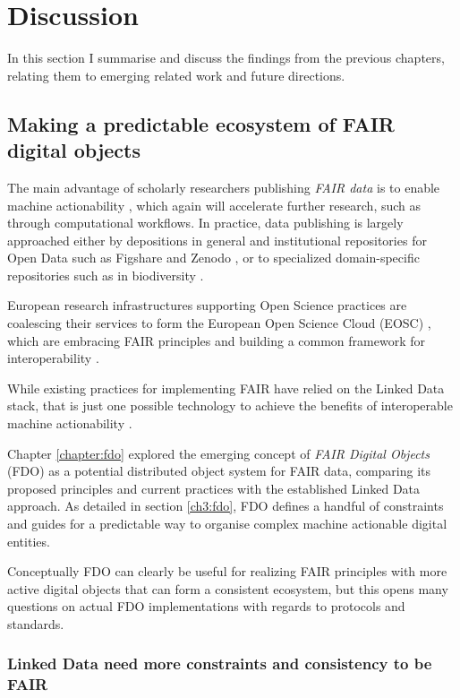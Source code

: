 \section{Discussion}
\label{ch61:discuss}

In this section I summarise and discuss the findings from the previous chapters, relating them to emerging related work and future directions.

\subsection{Making a predictable ecosystem of FAIR digital objects}
\label{ch61:ecosystem}

The main advantage of scholarly researchers publishing \emph{FAIR data} is to enable machine actionability \cite{Wilkinson 2016}, which again will accelerate further research, such as through computational workflows. 
In practice, data publishing is largely approached either by depositions in general and institutional repositories for Open Data such as Figshare and Zenodo \cite{Dillen 2019}, or to specialized domain-specific repositories such as in biodiversity \cite{ch8-7}. 

European research infrastructures supporting Open Science practices are coalescing their services to form the European Open Science Cloud (EOSC) \cite{10.2777/940154}, which are embracing FAIR principles \cite{Mons 2017} and building a common framework for interoperability \cite{eosc-interop-framework}. 

While existing practices for implementing FAIR have relied on the Linked Data stack, that is just one possible technology to achieve the benefits of interoperable machine actionability \cite{Mons 2017}. 

Chapter \ref{chapter:fdo} explored the emerging concept of \emph{FAIR Digital Objects} (FDO) \cite{Schultes 2019} as a potential distributed object system for FAIR data, comparing its proposed principles and current practices with the established Linked Data approach. 
As detailed in section \vref{ch3:fdo}, FDO defines a handful of constraints and guides for a predictable way to organise complex machine actionable digital entities. 

Conceptually FDO can clearly be useful for realizing FAIR principles with more active digital objects that can form a consistent ecosystem, but this opens many questions on actual FDO implementations with regards to protocols and standards.

\subsubsection{Linked Data need more constraints and consistency to be FAIR}
\label{ch61:constraints}

